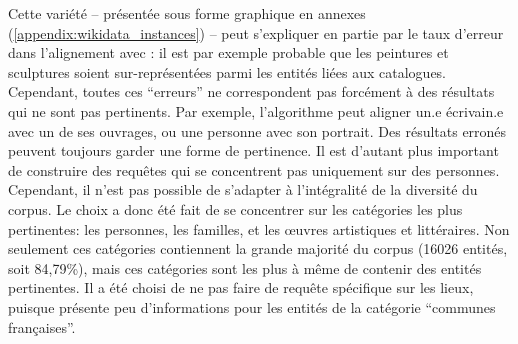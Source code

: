 Cette variété -- présentée sous forme graphique en annexes (\ref{appendix:wikidata_instances}) -- peut s'expliquer en partie par le taux d'erreur dans l'alignement avec \wkd{}: il est par exemple probable que les peintures et sculptures soient sur-représentées parmi les entités \wkd{} liées aux catalogues. Cependant, toutes ces \enquote{erreurs} ne correspondent pas forcément à des résultats qui ne sont pas pertinents. Par exemple, l'algorithme peut aligner un.e écrivain.e avec un de ses ouvrages, ou une personne avec son portrait. Des résultats erronés peuvent toujours garder une forme de pertinence. Il est d'autant plus important de construire des requêtes \sparql{} qui se concentrent pas uniquement sur des personnes. Cependant, il n'est pas possible de s'adapter à l'intégralité de la diversité du corpus. Le choix a donc été fait de se concentrer sur les catégories les plus pertinentes: les personnes, les familles, et les œuvres artistiques et littéraires. Non seulement ces catégories contiennent la grande majorité du corpus (16026 entités, soit 84,79\%), mais ces catégories sont les plus à même de contenir des entités pertinentes. Il a été choisi de ne pas faire de requête spécifique sur les lieux, puisque \wkd{} présente peu d'informations pour les entités de la catégorie \enquote{communes françaises}.

